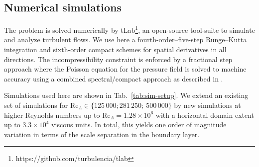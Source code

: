 \documentclass[smallcondensed,final]{svjour3}
\newcommand{\RE}{\mathrm{Re}}
\begin{document}
\subsection{Numerical simulations}
The problem is solved numerically by tLab\footnote{https://github.com/turbulencia/tlab},
an open-source tool-suite to simulate and analyze turbulent flows.
% 
We use here a fourth-order--five-step Runge--Kutta integration and sixth-order compact schemes
for spatial derivatives in all directions.
%
The incompressibility constraint is enforced by a fractional step approach where the Poisson equation
for the pressure field is solved to machine accuracy using a combined spectral/compact approach as
described in \citet{mellado:ZaM2012}.
%
\par
%
Simulations used here are shown in Tab.~\ref{tab:sim-setup}.
%
We extend an existing set of simulations for $\RE_\Lambda\in\{125\,000; 281\,250;\ 500\,000\}$ \citep[gray shading; cf.][]{ansorge:BM2014,ansorge:JFM2016} 
by new simulations at higher Reynolds numbers up to $\RE_\Lambda=1.28\times10^6$ with a horizontal domain extent up to $3.3\times 10^4$ viscous units. 
%
In total, this yields one order of magnitude variation in terms of the scale separation in the boundary layer.
%
\end{document}
